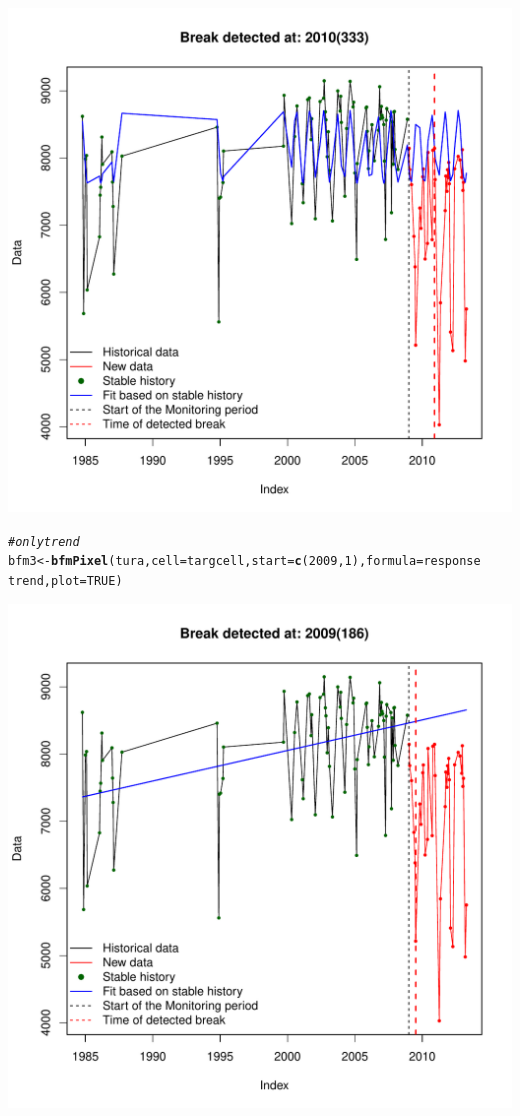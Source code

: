 \documentclass{article}\usepackage[]{graphicx}\usepackage[]{color}
\makeatletter
\def\maxwidth{ %
  \ifdim\Gin@nat@width>\linewidth
    \linewidth
  \else
    \Gin@nat@width
  \fi
}
\newcommand{\hlnum}[1]{\textcolor[rgb]{0.686,0.059,0.569}{#1}}%
\newcommand{\hlcom}[1]{\textcolor[rgb]{0.678,0.584,0.686}{\textit{#1}}}%
\newcommand{\hlopt}[1]{\textcolor[rgb]{0,0,0}{#1}}%
\newcommand{\hlstd}[1]{\textcolor[rgb]{0.345,0.345,0.345}{#1}}%
\newcommand{\hlkwb}[1]{\textcolor[rgb]{0.69,0.353,0.396}{#1}}%
\newcommand{\hlkwc}[1]{\textcolor[rgb]{0.333,0.667,0.333}{#1}}%
\newcommand{\hlkwd}[1]{\textcolor[rgb]{0.737,0.353,0.396}{\textbf{#1}}}%
\newenvironment{kframe}{%
 \def\at@end@of@kframe{}%
 \ifinner\ifhmode%
  \def\at@end@of@kframe{\end{minipage}}%
  \begin{minipage}{\columnwidth}%
 \fi\fi%
 \def\FrameCommand##1{\hskip\@totalleftmargin \hskip-\fboxsep
 \colorbox{shadecolor}{##1}\hskip-\fboxsep
     \hskip-\linewidth \hskip-\@totalleftmargin \hskip\columnwidth}%
 \MakeFramed {\advance\hsize-\width
   \@totalleftmargin\z@ \linewidth\hsize
   \@setminipage}}%
 {\par\unskip\endMakeFramed%
 \at@end@of@kframe}
\newenvironment{knitrout}{}{} %
\makeatother
\begin{document}
\begin{knitrout}
\begin{kframe}
\begin{alltt}
\end{alltt}
\end{kframe}
\includegraphics[width=\maxwidth]{figure/bfmPixel-args2} 
\begin{kframe}\begin{alltt}
\hlcom{# only trend}
\hlstd{bfm3} \hlkwb{<-} \hlkwd{bfmPixel}\hlstd{(tura,} \hlkwc{cell} \hlstd{= targcell,} \hlkwc{start} \hlstd{=} \hlkwd{c}\hlstd{(}\hlnum{2009}\hlstd{,} \hlnum{1}\hlstd{),} \hlkwc{formula} \hlstd{= response} \hlopt{~}
    \hlstd{trend,} \hlkwc{plot} \hlstd{=} \hlnum{TRUE}\hlstd{)}
\end{alltt}
\end{kframe}
\includegraphics[width=\maxwidth]{figure/bfmPixel-args3} 

\end{knitrout}
\end{document}
